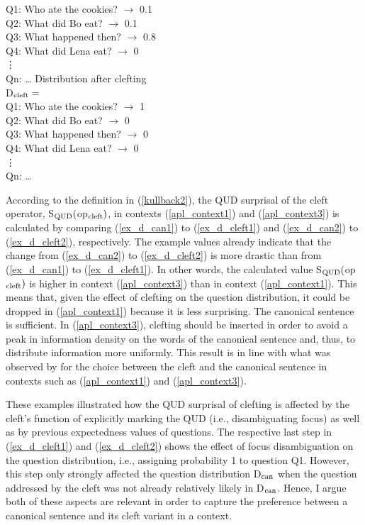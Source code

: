 \documentclass[output=paper,colorlinks,citecolor=brown]{langscibook}
\begin{document}
Q1: Who ate the cookies? $\rightarrow$ 0.1\\
Q2: What did Bo eat? $\rightarrow$ 0.1\\
Q3: What happened then? $\rightarrow$ 0.8\\
Q4: What did Lena eat? $\rightarrow$ 0\\
\hspace{3ex}\vdots\\
Qn: \dots
\ex Distribution after clefting \label{ex_d_cleft2}\\
D$\textsubscript{cleft}=$\\
Q1: Who ate the cookies? $\rightarrow$ 1\\
Q2: What did Bo eat? $\rightarrow$ 0\\
Q3: What happened then? $\rightarrow$ 0\\
Q4: What did Lena eat? $\rightarrow$ 0\\
\hspace{3ex}\vdots\\
Qn: \dots
\z

\begin{sloppypar}
\noindent According to the definition in (\ref{kullback2}), the QUD surprisal of the cleft operator, S$\textsubscript{QUD}($op$\textsubscript{cleft})$, in contexts (\ref{apl_context1}) and (\ref{apl_context3}) is calculated by comparing (\ref{ex_d_can1}) to (\ref{ex_d_cleft1}) and (\ref{ex_d_can2}) to (\ref{ex_d_cleft2}), respectively. The example values already indicate that the change from (\ref{ex_d_can2}) to (\ref{ex_d_cleft2}) is more drastic than from  (\ref{ex_d_can1}) to (\ref{ex_d_cleft1}). In other words, the calculated value S$\textsubscript{QUD}($op$\textsubscript{cleft})$ is higher in context (\ref{apl_context3}) than in context (\ref{apl_context1}). This means that, given the effect of clefting on the question distribution, it could be dropped in (\ref{apl_context1}) because it is less surprising. The canonical sentence is sufficient. In (\ref{apl_context3}), clefting should be inserted in order to avoid a peak in information density on the words of the canonical sentence and, thus, to distribute information more uniformly. This result is in line with what was observed by \citet{tonnis_tonhauser_2022} for the choice between the cleft and the canonical sentence in contexts such as (\ref{apl_context1}) and (\ref{apl_context3}). 
\end{sloppypar}

These examples illustrated how the QUD surprisal of clefting is affected by the cleft's function of explicitly marking the QUD (i.e., disambiguating focus) as well as by previous expectedness values of questions. The respective last step in (\ref{ex_d_cleft1}) and (\ref{ex_d_cleft2}) shows the effect of focus disambiguation on the question distribution, i.e., assigning probability 1 to question Q1. However, this step only strongly affected the question distribution D$\textsubscript{can}$ when the question addressed by the cleft was not already relatively likely in D$\textsubscript{can}$. Hence, I argue both of these aspects are relevant in order to capture the preference between a canonical sentence and its cleft variant in a context.
\end{document}

